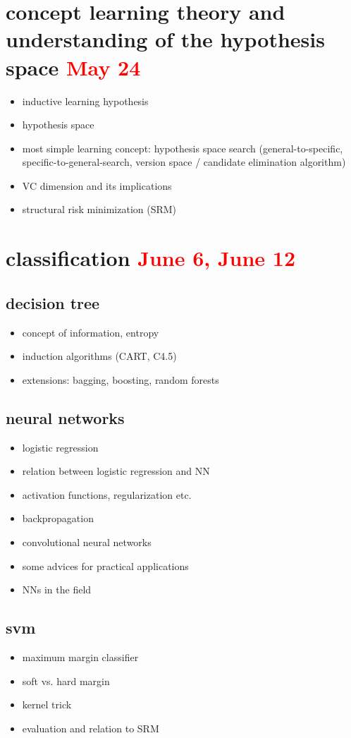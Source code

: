 \documentclass[a4paper]{article}
\begin{document}
\section{concept learning theory and understanding of the hypothesis space \textcolor{red}{May 24}} %
\begin{itemize}
\item inductive learning hypothesis
\item hypothesis space 
\item most simple learning concept: hypothesis space search (general-to-specific, specific-to-general-search, version space / candidate elimination algorithm)
\item VC dimension and its implications
\item structural risk minimization (SRM)
\end{itemize}


\section{classification \textcolor{red}{June 6, June 12}}
\subsection{decision tree}
\begin{itemize}
\item concept of information, entropy
\item induction algorithms (CART, C4.5)
\item extensions: bagging, boosting, random forests
\end{itemize}
\subsection{neural networks}
\begin{itemize}
\item logistic regression
\item relation between logistic regression and NN
\item activation functions, regularization etc.
\item backpropagation
\item convolutional neural networks
\item some advices for practical applications
\item NNs in the field
\end{itemize}
\subsection{svm}
\begin{itemize}
\item maximum margin classifier
\item soft vs. hard margin
\item kernel trick
\item evaluation and relation to SRM
\end{itemize}
\end{document}
